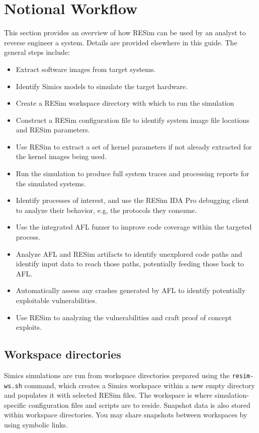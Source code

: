 \documentclass[titlepage]{article}
\begin{document}
\section{Notional Workflow}
\label{workflow}
This section provides an overview of how RESim can be used by an analyst to reverse engineer a system. Details are provided elsewhere
in this guide.  The general steps include:
\begin{itemize}
\item Extract software images from target systems.
\item Identify Simics models to simulate the target hardware.
\item Create a RESim workspace directory with which to run the simulation
\item Construct a RESim configuration file to identify system image file locations and RESim parameters.
\item Use RESim to extract a set of kernel parameters if not already extracted for the kernel images being used.
\item Run the simulation to produce full system traces and processing reports for the simulated systems.
\item Identify processes of interest, and use the RESim IDA Pro debugging client to analyze their behavior, e.g, the protocols they consume.
\item Use the integrated AFL fuzzer to improve code coverage within the targeted process.
\item Analyze AFL and RESim artifacts to identify unexplored code paths and identify input data to reach those paths, potentially feeding those back to AFL.
\item Automatically assess any crashes generated by AFL to identify potentially exploitable vulnerabilities.
\item Use RESim to analyzing the vulnerabilities and craft proof of concept exploits.
\end{itemize}

\subsection{Workspace directories}
Simics simulations are run from workspace directories prepared using the {\tt resim-ws.sh} command, which creates a Simics workspace within a new empty
directory and populates it with selected RESim files.  The workspace is where simulation-specific configuration files and scripts are to reside.  Snapshot
data is also stored within workspace directories.  You may share snapshots between workspaces by using symbolic links.  
\end{document}
